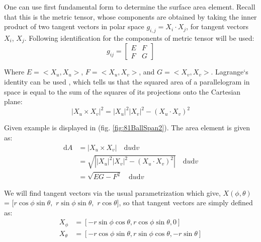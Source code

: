 \noindent One can use first fundamental form to determine the surface area element. Recall that this is the metric tensor, whose components are obtained by taking the inner product of two tangent vectors in polar space $g_{i,j}= X_i \cdot X_j$, for tangent vectors $X_i$, $X_j$. Following identification for the components of metric tensor will be used:
\begin{equation}\label{eq:metricTensorIdentification}
    g_{ij}=
    \begin{bmatrix}
        E&F\\
        F&G
    \end{bmatrix}
\end{equation}

\noindent Where $E=<X_u,X_u>$, $F=<X_u,X_v>$, and $G=<X_v,X_v>$. Lagrange`s identity can be used , which tells us that the squared area of a parallelogram in space is equal to the sum of the squares of its projections onto the Cartesian plane:
\begin{equation}\label{eq:CartesianProjectionIdentity}
    |X_u \times X_v|^2 = |X_u|^2|X_v|^2 - \left(X_u\cdot X_v\right)^2
\end{equation}

\noindent Given example is displayed in (fig. \ref{fig:81BallSpan2}). The area element is given as:
\begin{equation}\label{eq:squareElementSurfaceDerivation}
    \begin{aligned}
    \text{d}A &= |X_u \times X_v| \quad\text{d}u\text{d}v \\
    & = \sqrt{\left||X_u|^2|X_v|^2 - \left(X_u\cdot X_v\right)^2\right|}\quad \text{d}u\text{d}v\\ 
    & = \sqrt{EG-F^2} \quad \text{d}u\text{d}v
    \end{aligned}
\end{equation}

\noindent We will find tangent vectors via the usual parametrization which give, $X(\phi,\theta)$ = $[r \cos\phi\sin\theta,$ $r\sin\phi\sin\theta,$ $r\cos\theta]$, so that tangent vectors are simply defined as:
\begin{equation}\label{eq:tangentVectorsForPlanarSurface}
    \begin{aligned}
        X_\phi &= [-r\sin\phi\cos\theta,r\cos\phi\sin\theta,0]\\
        X_\theta &=[-r\cos\phi\sin\theta,r\sin\phi\cos\theta,-r\sin\theta]
    \end{aligned}
\end{equation}

